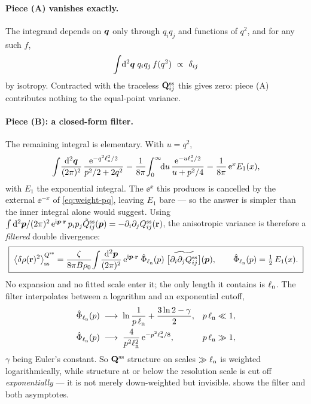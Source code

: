 \documentclass[a5paper]{article}
\begin{document}
\paragraph{Piece (A) vanishes exactly.} The integrand depends on $\boldsymbol q$ only through $q_iq_j$ and functions of $q^2$, and for any such $f$,
\begin{equation}
    \label{eq:isotropy-identity}
    \int\!\mathrm{d}^2\boldsymbol q\;q_iq_j\,f(q^2)~ \propto~ \delta_{ij}
\end{equation}
by isotropy. Contracted with the traceless $\tilde{\mathbf{Q}}^{\mathrm{ss}}_{ij}$ this gives zero: piece (A) contributes nothing to the equal-point variance.

\paragraph{Piece (B): a closed-form filter.} The remaining integral is elementary. With $u=q^2$,
\begin{equation}
    \label{eq:aniso-inner}
    \int\!\frac{\mathrm{d}^2\boldsymbol q}{(2\pi)^2}\,\frac{\mathrm{e}^{-q^2\ell_{\rm n}^2/2}}{p^2/2+2q^2}
    = \frac{1}{8\pi}\!\int_0^\infty\!\!\mathrm{d} u\,\frac{\mathrm{e}^{-u\ell_{\rm n}^2/2}}{u+p^2/4}
    = \frac{1}{8\pi}\,\mathrm{e}^{x}E_1(x),
\end{equation}
with $E_1$ the exponential integral. The $\ee^{x}$ this produces is cancelled by the external $\ee^{-x}$ of \eqref{eq:weight-pq}, leaving $E_1$ bare --- so the answer is simpler than the inner integral alone would suggest. Using $\int\mathrm{d}^2\boldsymbol p/(2\pi)^2\,\mathrm{e}^{\mathrm{i}\boldsymbol p\cdot\mathbf{r}}\,p_ip_j\tilde Q^{\mathrm{ss}}_{ij}(\boldsymbol p) = -\partial_i\partial_jQ^{\mathrm{ss}}_{ij}(\mathbf{r})$, the anisotropic variance is therefore a \emph{filtered} double divergence:
\begin{equation}
    \label{eq:aniso-kernel}
    \boxed{\;
    \left\langle\delta\rho(\mathbf{r})^2\right\rangle^{Q^{\mathrm{ss}}}_{\mathrm{ss}}
    = \frac{\zeta}{8\pi B\rho_0}\!\int\!\frac{\mathrm{d}^2\boldsymbol p}{(2\pi)^2}\,\mathrm{e}^{\mathrm{i}\boldsymbol p\cdot\mathbf{r}}\;
    \hat\Phi_{\ell_{\rm n}}(p)\;\widetilde{\bigl[\partial_i\partial_jQ^{\mathrm{ss}}_{ij}\bigr]}(\boldsymbol p),
    \qquad
    \hat\Phi_{\ell_{\rm n}}(p) = \tfrac12\,E_1(x).
    \;}
\end{equation}
No expansion and no fitted scale enter it; the only length it contains is $\ell_{\rm n}$. The filter interpolates between a logarithm and an exponential cutoff,
\begin{align}
    \label{eq:K-asymptotics}
    \hat\Phi_{\ell_{\rm n}}(p) &\;\longrightarrow\;
        \ln\frac{1}{p\,\ell_{\rm n}} + \frac{3\ln2-\gamma}{2},
        & p\,\ell_{\rm n} &\ll 1,
    \\
    \hat\Phi_{\ell_{\rm n}}(p) &\;\longrightarrow\; \frac{4}{p^2\ell_{\rm n}^2}\,\mathrm{e}^{-p^2\ell_{\rm n}^2/8},
        & p\,\ell_{\rm n} &\gg 1,
    \nonumber
\end{align}
$\gamma$ being Euler's constant. So $\mathbf{Q}^{\mathrm{ss}}$ structure on scales $\gg\ell_{\rm n}$ is weighted logarithmically, while structure at or below the resolution scale is cut off \emph{exponentially} --- it is not merely down-weighted but invisible.  shows the filter and both asymptotes.
\end{document}
